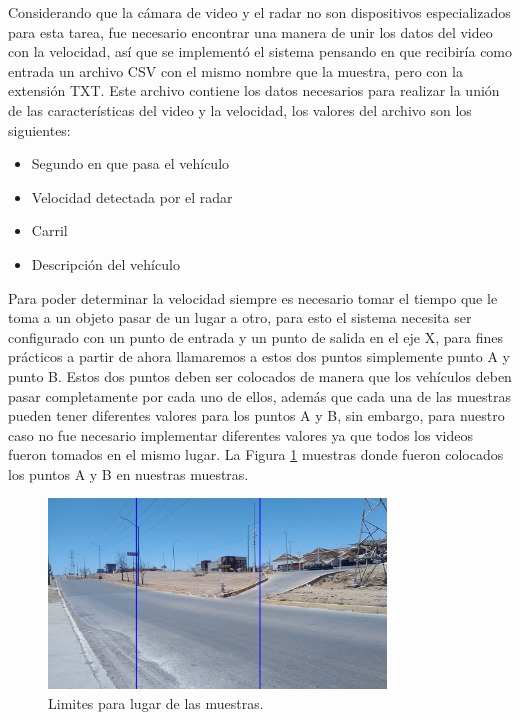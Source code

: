 Considerando que la cámara de video y el radar no son dispositivos especializados para esta tarea, fue necesario encontrar una manera de unir los datos del video con la velocidad, así que se implementó el sistema pensando en que recibiría como entrada un archivo CSV con el mismo nombre que la muestra, pero con la extensión TXT. Este archivo contiene los datos necesarios para realizar la unión de las características del video y la velocidad, los valores del archivo son los siguientes:

\begin{itemize}
    \item Segundo en que pasa el vehículo
    \item Velocidad detectada por el radar
    \item Carril
    \item Descripción del vehículo
\end{itemize}

Para poder determinar la velocidad siempre es necesario tomar el tiempo que le toma a un objeto pasar de un lugar a otro, para esto el sistema necesita ser configurado con un punto de entrada y un punto de salida en el eje X, para fines prácticos a partir de ahora llamaremos a estos dos puntos simplemente punto A y punto B.  Estos dos puntos deben ser colocados de manera que los vehículos deben pasar completamente por cada uno de ellos, además que cada una de las muestras pueden tener diferentes valores para los puntos A y B, sin embargo, para nuestro caso no fue necesario implementar diferentes valores ya que todos los videos fueron tomados en el mismo lugar. La Figura \ref{fig:LugarLimites} muestras donde fueron colocados los puntos A y B en nuestras muestras.

\begin{figure}[H]
    \centering
    \includegraphics[width=0.8\textwidth]{Metodologia/imgs/LugarLimites.jpg}
    \caption{Limites para lugar de las muestras.}
    \label{fig:LugarLimites}
\end{figure}

